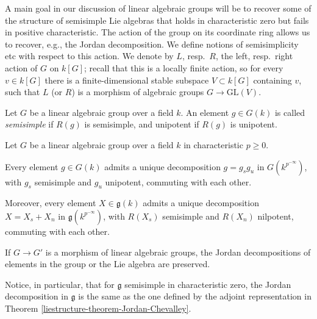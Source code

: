 A main goal in our discussion of linear algebraic groups will be to recover some of the structure of semisimple Lie algebras that holds in characteristic zero but fails in positive characteristic. The action of the group on its coordinate ring allows us to recover, e.g., the Jordan decomposition. We define notions of semisimplicity etc with respect to this action. We denote by $L$, resp.\ $R$, the left, resp.\ right action of $G$ on $k[G]$; recall that this is a locally finite action, so for every $v\in k[G]$ there is a finite-dimensional stable subspace $V\subset k[G]$ containing $v$, such that $L$ (or $R$) is a morphism of algebraic groups $G\to \text{GL}(V)$.

\begin{definition}
\label{definition-semisimple-unipotent-group}
 Let $G$ be a linear algebraic group over a field $k$. An element $g\in G(k)$ is called \emph{semisimple} if $R(g)$ is semisimple, and unipotent if $R(g)$ is unipotent. 
\end{definition}

\begin{theorem}
\label{theorem-Jordan-group}
 Let $G$ be a linear algebraic group over a field $k$ in characteristic $p\ge 0$. 
 
 Every element $g\in G(k)$ admits a unique decomposition $g = g_s g_u$ in $G(k^{p^{-\infty}})$, with $g_s$ semisimple and $g_u$ unipotent, commuting with each other.
 
 Moreover, every element $X\in \mathfrak g(k)$ admits a unique decomposition $X = X_s + X_n$ in $\mathfrak g(k^{p^{-\infty}})$, with $R(X_s)$ semisimple and $R(X_n)$ nilpotent, commuting with each other.
 
 If $G\to G'$ is a morphism of linear algebraic groups, the Jordan decompositions of elements in the group or the Lie algebra are preserved.
\end{theorem}

Notice, in particular, that for $\mathfrak g$ semisimple in characteristic zero, the Jordan decomposition in $\mathfrak g$ is the same as the one defined by the adjoint representation in Theorem \ref{liestructure-theorem-Jordan-Chevalley}.

